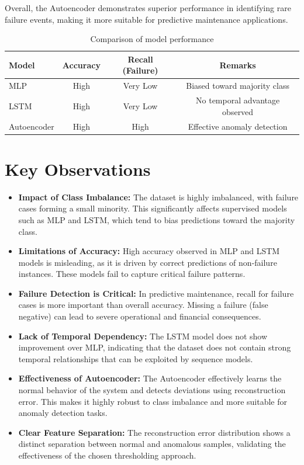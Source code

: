 \documentclass{ecsproject}     %
\begin{document}
Overall, the Autoencoder demonstrates superior performance in identifying rare failure events, making it more suitable for predictive maintenance applications.

\begin{table}[h]
\centering
\begin{tabular}{lccc}
\hline
\textbf{Model} & \textbf{Accuracy} & \textbf{Recall (Failure)} & \textbf{Remarks} \\
\hline
MLP & High & Very Low & Biased toward majority class \\
LSTM & High & Very Low & No temporal advantage observed \\
Autoencoder & High & High & Effective anomaly detection \\
\hline
\end{tabular}
\caption{Comparison of model performance}
\end{table}

\section{Key Observations}

\begin{itemize}
    \item \textbf{Impact of Class Imbalance:} The dataset is highly imbalanced, with failure cases forming a small minority. This significantly affects supervised models such as MLP and LSTM, which tend to bias predictions toward the majority class.

    \item \textbf{Limitations of Accuracy:} High accuracy observed in MLP and LSTM models is misleading, as it is driven by correct predictions of non-failure instances. These models fail to capture critical failure patterns.

    \item \textbf{Failure Detection is Critical:} In predictive maintenance, recall for failure cases is more important than overall accuracy. Missing a failure (false negative) can lead to severe operational and financial consequences.

    \item \textbf{Lack of Temporal Dependency:} The LSTM model does not show improvement over MLP, indicating that the dataset does not contain strong temporal relationships that can be exploited by sequence models.

    \item \textbf{Effectiveness of Autoencoder:} The Autoencoder effectively learns the normal behavior of the system and detects deviations using reconstruction error. This makes it highly robust to class imbalance and more suitable for anomaly detection tasks.

    \item \textbf{Clear Feature Separation:} The reconstruction error distribution shows a distinct separation between normal and anomalous samples, validating the effectiveness of the chosen thresholding approach.
\end{itemize}
\end{document}
